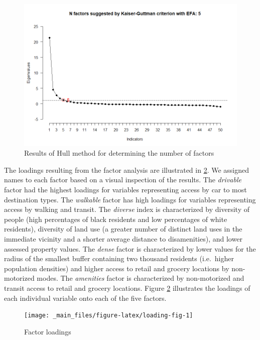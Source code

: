 \documentclass[
]{book}
\begin{document}
\begin{figure}
\includegraphics[width=1\linewidth]{04_figures/KGC-n-factors} \caption{Results of Hull method for determining the number of factors}\label{fig:kgc-figure}
\end{figure}

The loadings resulting from the factor analysis are illustrated in
\ref{fig:loading-fig}. We assigned names to each factor based on a visual
inspection of the results. The \emph{drivable} factor had the highest loadings
for variables representing access by car to most destination types. The
\emph{walkable} factor has high loadings for variables representing access
by walking and transit. The \emph{diverse} index is characterized by diversity of
people (high percentages of black residents and low percentages of white
residents), diversity of land use (a greater number of distinct land
uses in the immediate vicinity and a shorter average distance to disamenities),
and lower assessed property values. The \emph{dense} factor is characterized by lower
values for the radius of the smallest buffer containing two thousand residents
(i.e.~higher population densities) and higher access to retail and grocery
locations by non-motorized modes. The \emph{amenities} factor is characterized
by non-motorized and transit access to retail and grocery locations. Figure
\ref{fig:loading-fig} illustrates the loadings of each individual variable
onto each of the five factors.

\begin{figure}
\texttt{[image: \_main\_files/figure-latex/loading-fig-1]} \caption{Factor loadings}\label{fig:loading-fig}
\end{figure}
\end{document}
